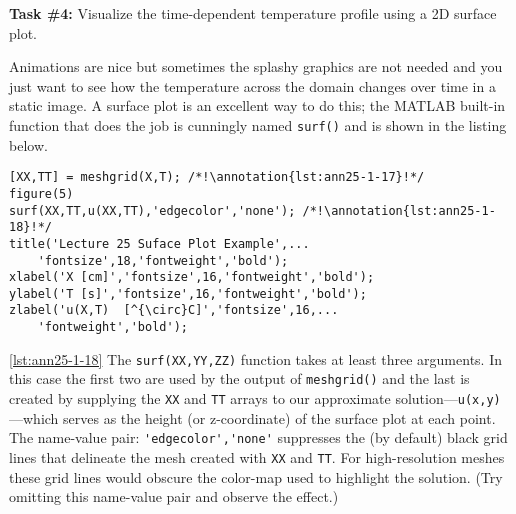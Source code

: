 \vspace{0.25cm}
\setcounter{lstannotation}{0} %
\noindent\textbf{Task \#4: } Visualize the time-dependent temperature profile using a 2D surface plot.

\vspace{0.15cm}

\noindent Animations are nice but sometimes the splashy graphics are not needed and you just want to see how the temperature across the domain changes over time in a static image.  A surface plot is an excellent way to do this; the MATLAB built-in function that does the job is cunningly named \lstinline[style=myMatlab]{surf()} and is shown in the listing below.
\begin{lstlisting}[style=myMatlab, name=lec25-ex1]
%% Plot the temperature vs time in a 2D plot using the surf function
[XX,TT] = meshgrid(X,T); /*!\annotation{lst:ann25-1-17}!*/
figure(5)
surf(XX,TT,u(XX,TT),'edgecolor','none'); /*!\annotation{lst:ann25-1-18}!*/
title('Lecture 25 Suface Plot Example',...
    'fontsize',18,'fontweight','bold');
xlabel('X [cm]','fontsize',16,'fontweight','bold');
ylabel('T [s]','fontsize',16,'fontweight','bold');
zlabel('u(X,T)  [^{\circ}C]','fontsize',16,...
    'fontweight','bold');
\end{lstlisting}

\vspace{0.2cm}

\ref{lst:ann25-1-18} The \lstinline[style=myMatlab]{surf(XX,YY,ZZ)} function takes at least three arguments.  In this case the first two are used by the output of \lstinline[style=myMatlab]{meshgrid()} and the last is created by supplying the \lstinline{XX} and \lstinline{TT} arrays to our approximate solution---\lstinline{u(x,y)}---which serves as the height (or z-coordinate) of the surface plot at each point. The name-value pair: \lstinline{'edgecolor','none'} suppresses the (by default) black grid lines that delineate the mesh created with \lstinline{XX} and \lstinline{TT}.  For high-resolution meshes these grid lines would obscure the color-map used to highlight the solution. (Try omitting this name-value pair and observe the effect.)

